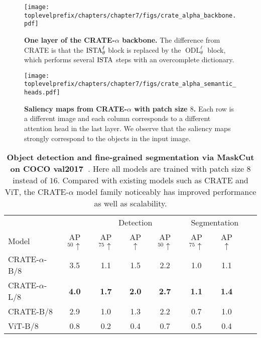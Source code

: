 \documentclass[\toplevelprefix/book-main.tex]{subfiles}
\begin{document}
\begin{figure}
    \centering 
    \texttt{[image: \\toplevelprefix/chapters/chapter7/figs/crate\_alpha\_backbone.pdf]}
    \caption{\small\textbf{One layer of the CRATE-\(\alpha\) backbone.} The difference from CRATE is that the \(\operatorname{ISTA}_{\theta}^{\ell}\) block is replaced by the \(\operatorname{ODL}_{\theta}^{\ell}\) block, which performs several \(\operatorname{ISTA}\) steps with an overcomplete dictionary.}
    \label{fig:crate_alpha_backbone}
\end{figure}

\begin{figure}
    \centering 
    \texttt{[image: \\toplevelprefix/chapters/chapter7/figs/crate\_alpha\_semantic\_heads.pdf]}
    \caption{\small\textbf{Saliency maps from CRATE-\(\alpha\) with patch size \(8\).} Each row is a different image and each column corresponds to a different attention head in the last layer. We observe that the saliency maps strongly correspond to the objects in the input image.}
    \label{fig:crate_alpha_saliency_maps}
\end{figure}

\begin{table}
    \centering
    \begin{tabular}{@{}lcccccccc@{}}
    \toprule
     &  & \multicolumn{3}{c}{Detection} &  \multicolumn{3}{c}{Segmentation} \\ 
    Model & AP$_{50} \uparrow $ & AP$_{75} \uparrow $ & AP $\uparrow$ & AP$_{50} \uparrow$ & AP$_{75} \uparrow $ & AP $\uparrow$ \\ 
    \midrule
    \midrule
    CRATE-\(\alpha\)-B/8 & 3.5 & 1.1 & 1.5 & 2.2 & 1.0 & 1.1 \\
    CRATE-\(\alpha\)-L/8 & \textbf{4.0} & \textbf{1.7} & \textbf{2.0} & \textbf{2.7} & \textbf{1.1} & \textbf{1.4} \\
    \midrule
    \color{gray}CRATE-B/8 & \color{gray}2.9 & \color{gray}1.0 & \color{gray}1.3 & \color{gray}2.2 & \color{gray}0.7 & \color{gray}1.0 \\
    \color{gray}ViT-B/8 & \color{gray}0.8 & \color{gray}0.2 & \color{gray}0.4 & \color{gray}0.7 & \color{gray}0.5 & \color{gray}0.4 \\
    \bottomrule
    \end{tabular}
    \caption{\small \textbf{Object detection and fine-grained segmentation via MaskCut on COCO val2017~\citep{lin2014microsoft}}. Here all models are trained with patch size \(8\) instead of \(16\). Compared with existing models such as CRATE and ViT, the CRATE-\(\alpha\) model family noticeably has improved performance as well as scalability.}
    \label{tab:crate_alpha_detection_segmentation}
\end{table}
\end{document}
